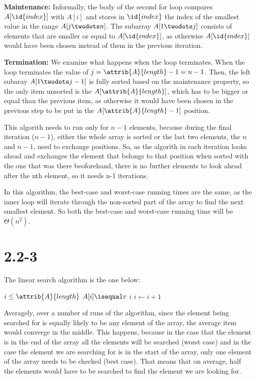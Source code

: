 \documentclass{article}
\begin{document}
\textbf{Maintenance:} Informally, the body of the second for loop compares $A[\id{index}]$ with $A[i]$ and stores in $\id{index}$ the index of the smallest value in the range $A[j \twodots n]$. The subarray $A[1 \twodots j]$ consists of elements that are smaller or equal to $A[\id{index}]$, as otherwise $A[\id{index}]$ would have been chosen instead of them in the previous iteration.

\textbf{Termination:} We examine what happens when the loop terminates. When the loop terminates the value of $j = \attrib{A}{length} - 1 = n - 1$. Then,  the left subaray $A[1 \twodots j-1]$ is fully sorted based on the maintenance property, so the only item unsorted is the $A[\attrib{A}{length}]$, which has to be bigger or equal than the previous item, as otherwise it would have been chosen in the previous step to be put in the $A[\attrib{A}{length}-1]$ position.

This algorith needs to run only for $n-1$ elements, because during the final iteration ($n-1$), either the whole array is sorted or the last two elements, the $n$ and $n-1$, need to exchange positions. So, as the algorith in each iteration looks ahead and exchanges the element that belongs to that position when sorted with the one that was there beoforehand, there is no further elements to look ahead after the nth element, so it needs n-1 iterations.

In this algorithm, the best-case and worst-case running times are the same, as the inner loop will iterate through the non-sorted part of the array to find the next smallest element. So both the best-case and worst-case running time will be $\Theta(n^2)$.

\section*{2.2-3}
The linear search algorithm is the one below: 

\begin{codebox}
  \li \While $i \leq \attrib{A}{length}$
  \li \Do
        \If $A[i] \isequal v$
  \li   \Then
          \Return $i$
        \End
  \li     $i \gets i + 1$
      \End
  \li \Return {}
\end{codebox}

Averagely, over a number of runs of the algorithm, since the element being searched for is equally likely to be any element of the array, the average item would converge in the middle. This happens, because in the case that the element is in the end of the array all the elements will be searched (worst case) and in the case the element we are searching for is in the start of the array, only one element of the array needs to be checked (best case). That means that on average, half the elements would have to be searched to find the element we are looking for. 
\end{document}
